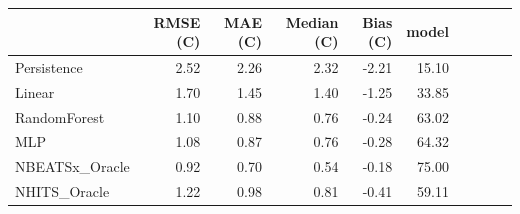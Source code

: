 \begin{tabular}{lrrrrr}
\toprule
 & RMSE (C) & MAE (C) & Median (C) & Bias (C) & %
model &  &  &  &  &  \\
\midrule
Persistence & 2.52 & 2.26 & 2.32 & -2.21 & 15.10 \\
Linear & 1.70 & 1.45 & 1.40 & -1.25 & 33.85 \\
RandomForest & 1.10 & 0.88 & 0.76 & -0.24 & 63.02 \\
MLP & 1.08 & 0.87 & 0.76 & -0.28 & 64.32 \\
NBEATSx_Oracle & 0.92 & 0.70 & 0.54 & -0.18 & 75.00 \\
NHITS_Oracle & 1.22 & 0.98 & 0.81 & -0.41 & 59.11 \\
\bottomrule
\end{tabular}
